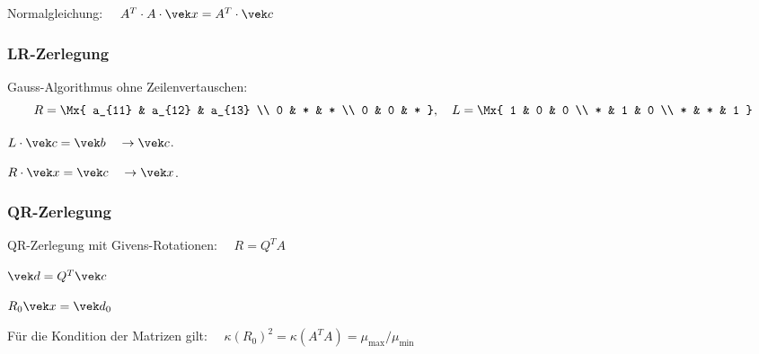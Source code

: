 		Normalgleichung: $\quad A^T \cdot A \cdot \vek x = A^T \cdot \vek c$
		
		\subsubsection{LR-Zerlegung} 
			\begin{algo}
				\begin{tightenumerate}
					\item Gauss-Algorithmus ohne Zeilenvertauschen:
						\[
							R = \Mx{
								a_{11} & a_{12} & a_{13} \\
								0 & * & * \\
								0 & 0 & *
							}, \quad L = \Mx{
								1 & 0 & 0 \\
								* & 1 & 0 \\
								* & * & 1
							}
						\]
					\item $L\cdot \vek c = \vek b \quad \rightarrow \vek c$. 
					\item $R \cdot \vek x = \vek c \quad \rightarrow \vek x$. 
				\end{tightenumerate}
			\end{algo}
			
		\subsubsection{QR-Zerlegung}
			\begin{algo}
				\begin{tightenumerate}
					\item QR-Zerlegung mit Givens-Rotationen: $\quad R = Q^T A$ 
					\item $\vek d = Q^T \vek c$ 
					\item $R_0 \vek x = \vek d_0$ 
				\end{tightenumerate}
				Für die Kondition der Matrizen gilt: $\quad \kappa(R_0)^2 = \kappa(A^T A) = \mu_\text{max}/\mu_\text{min}$ 
			\end{algo}
		
